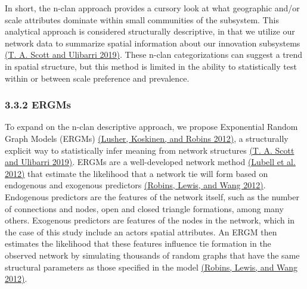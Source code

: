 \documentclass[twoside,12pt,final]{ucthesis-CA2012}
\begin{document}
\begin{ucmainmatter}
In short, the n-clan approach provides a cursory look at what geographic
and/or scale attributes dominate within small communities of the
subsystem. This analytical approach is considered structurally
descriptive, in that we utilize our network data to summarize spatial
information about our innovation subsystems \href{https://www.zotero.org/google-docs/?62cEU6}{(T. A. Scott and Ulibarri
2019)}. These n-clan
categorizations can suggest a trend in spatial structure, but this
method is limited in the ability to statistically test within or between
scale preference and prevalence.

\hypertarget{ergms}{%
\subsubsection{3.3.2 ERGMs}\label{ergms}}

To expand on the n-clan descriptive approach, we propose Exponential
Random Graph Models (ERGMs) \href{https://www.zotero.org/google-docs/?bQv9Lp}{(Lusher, Koskinen, and Robins
2012)}, a structurally
explicit way to statistically infer meaning from network structures \href{https://www.zotero.org/google-docs/?FEMYZk}{(T.
A. Scott and Ulibarri
2019)}. ERGMs are a
well-developed network method \href{https://www.zotero.org/google-docs/?ZHwDy8}{(Lubell et al.
2012)} that estimate the
likelihood that a network tie will form based on endogenous and
exogenous predictors \href{https://www.zotero.org/google-docs/?uHVeYc}{(Robins, Lewis, and Wang
2012)}. Endogenous
predictors are the features of the network itself, such as the number of
connections and nodes, open and closed triangle formations, among many
others. Exogenous predictors are features of the nodes in the network,
which in the case of this study include an actors\textquotesingle{} spatial attributes.
An ERGM then estimates the likelihood that these features influence tie
formation in the observed network by simulating thousands of random
graphs that have the same structural parameters as those specified in
the model \href{https://www.zotero.org/google-docs/?Bv0Hdb}{(Robins, Lewis, and Wang
2012)}.


\end{ucmainmatter}
\end{document}
